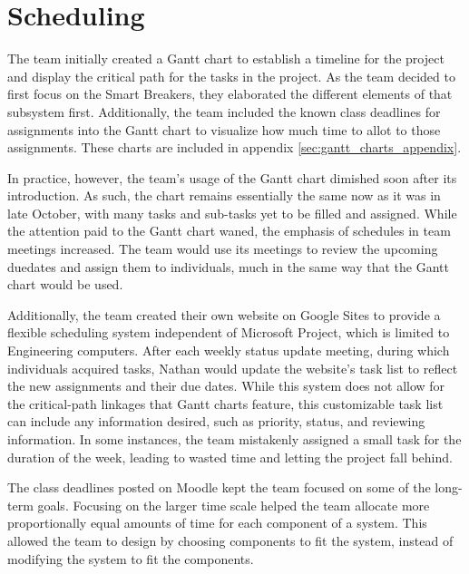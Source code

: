 \section{Scheduling}
The team initially created a Gantt chart to establish a timeline for the
project and display the critical path for the tasks in the project. As the
team decided to first focus on the Smart Breakers, they elaborated the
different elements of that subsystem first. Additionally, the team included
the known class deadlines for assignments into the Gantt chart to visualize
how much time to allot to those assignments. These charts are included in
appendix \ref{sec:gantt_charts_appendix}.

In practice, however, the team's usage of the Gantt chart dimished soon
after its introduction. As such, the chart remains essentially the same now
as it was in late October, with many tasks and sub-tasks yet to be filled
and assigned. While the attention paid to the Gantt chart waned, the
emphasis of schedules in team meetings increased. The team would use its
meetings to review the upcoming duedates and assign them to individuals,
much in the same way that the Gantt chart would be used.

Additionally, the team created their own website on Google Sites to provide
a flexible scheduling system independent of Microsoft Project, which is
limited to Engineering computers. After each weekly status update meeting,
during which individuals acquired tasks, Nathan would update the website's
task list to reflect the new assignments and their due dates. While this
system does not allow for the critical-path linkages that Gantt charts
feature, this customizable task list can include any information desired,
such as priority, status, and reviewing information. In some instances, the team mistakenly assigned a small task for the duration of the week, leading to wasted time and letting the project fall behind.

The class deadlines posted on Moodle kept the team focused on some of the long-term goals. Focusing on the larger time scale helped the team allocate more proportionally equal amounts of time for each component of a system. This allowed the team to design by choosing components to fit the system, instead of modifying the system to fit the components.